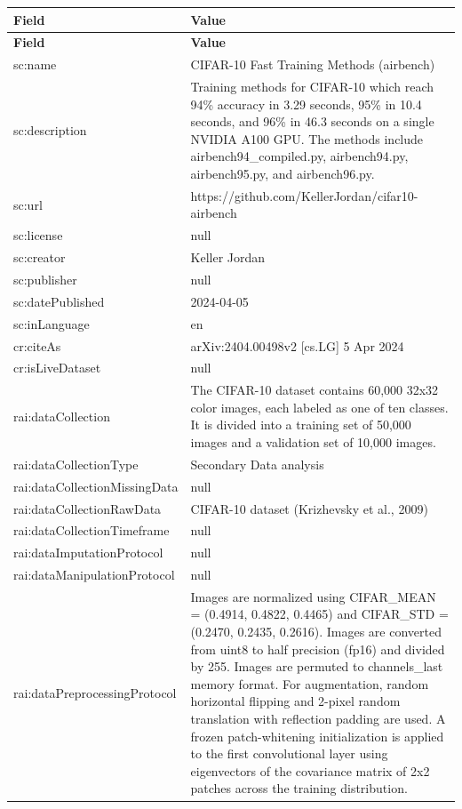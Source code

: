 \documentclass[10pt,a4paper]{article}
\begin{document}
\begin{longtable}{|p{4cm}|p{12cm}|}
\hline
\textbf{Field} & \textbf{Value} \\
\hline
\endfirsthead
\hline
\textbf{Field} & \textbf{Value} \\
\hline
\endhead
\hline
\endfoot

sc:name & CIFAR-10 Fast Training Methods (airbench) \\
\hline
sc:description & Training methods for CIFAR-10 which reach 94\% accuracy in 3.29 seconds, 95\% in 10.4 seconds, and 96\% in 46.3 seconds on a single NVIDIA A100 GPU. The methods include airbench94\_compiled.py, airbench94.py, airbench95.py, and airbench96.py. \\
\hline
sc:url & https://github.com/KellerJordan/cifar10-airbench \\
\hline
sc:license & null \\
\hline
sc:creator & Keller Jordan \\
\hline
sc:publisher & null \\
\hline
sc:datePublished & 2024-04-05 \\
\hline
sc:inLanguage & en \\
\hline
cr:citeAs & arXiv:2404.00498v2 [cs.LG] 5 Apr 2024 \\
\hline
cr:isLiveDataset & null \\
\hline
rai:dataCollection & The CIFAR-10 dataset contains 60,000 32x32 color images, each labeled as one of ten classes. It is divided into a training set of 50,000 images and a validation set of 10,000 images. \\
\hline
rai:dataCollectionType & Secondary Data analysis \\
\hline
rai:dataCollectionMissingData & null \\
\hline
rai:dataCollectionRawData & CIFAR-10 dataset (Krizhevsky et al., 2009) \\
\hline
rai:dataCollectionTimeframe & null \\
\hline
rai:dataImputationProtocol & null \\
\hline
rai:dataManipulationProtocol & null \\
\hline
rai:dataPreprocessingProtocol & Images are normalized using CIFAR\_MEAN = (0.4914, 0.4822, 0.4465) and CIFAR\_STD = (0.2470, 0.2435, 0.2616). Images are converted from uint8 to half precision (fp16) and divided by 255. Images are permuted to channels\_last memory format. For augmentation, random horizontal flipping and 2-pixel random translation with reflection padding are used. A frozen patch-whitening initialization is applied to the first convolutional layer using eigenvectors of the covariance matrix of 2x2 patches across the training distribution. \\

\end{longtable}
\end{document}
